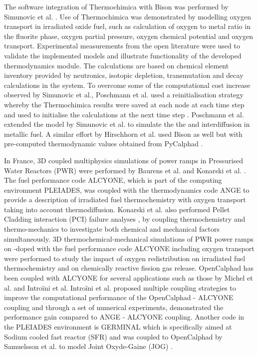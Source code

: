 	The software integration of Thermochimica with Bison was performed by Simunovic et al. \cite{Simunovic:2020aa}. Use of Thermochimica was demonstrated by modelling oxygen transport in irradiated  oxide fuel, such as calculation of oxygen to metal ratio in the fluorite phase, oxygen partial pressure, oxygen chemical potential and oxygen transport. Experimental measurements from the open literature were used to validate the implemented models and illustrate functionality of the developed thermodynamics module. The calculations are based on chemical element inventory provided by neutronics, isotopic depletion, transmutation and decay calculations in the \cite{SCALE05} system. To overcome some of the computational cost increase observed by Simunovic et al., Poschmann et al. used a reinitialisation strategy whereby the Thermochimica results were saved at each node at each time step and used to initialise the calculations at the next time step \cite{Poschmann:2019aa}. Poschmann et al. \cite{Poschmann:2021aa} extended the model by  Simunovic et al. to simulate the the  and  interdiffusion in  metallic fuel. A similar effort by Hirschhorn et al. used Bison as well but with pre-computed thermodynamic values obtained from PyCalphad \cite{Hirschhorn:2021aa}. 

	In France, 3D coupled multiphysics simulations of power ramps in Pressurised Water Reactors (PWR) were performed by Baurens et al. \cite{Baurens:2014aa} and  Konarski et al. \cite{KONARSKI2019104}. The fuel performance code {ALCYONE}, which is part of the computing environment {PLEIADES}, was coupled with the thermodynamics code {ANGE} to provide a description of irradiated fuel thermochemistry with oxygen transport taking into account thermodiffusion. Konarski et al. also performed Pellet Cladding interaction (PCI) failure analyses \cite{Piro:2020aa}, by coupling thermochemistry and thermo-mechanics to investigate both chemical and mechanical factors simultaneously. 3D thermochemical-mechanical simulations of PWR power ramps on -doped  with the fuel performance code {ALCYONE} including oxygen transport were performed to study the impact of oxygen redistribution on irradiated fuel thermochemistry and on chemically reactive fission gas release. OpenCalphad has been coupled with ALCYONE for several applications such as those by Michel et al. \cite{Michel:2013aa} and Intro\"{i}ni et al. Intro\"{i}ni et al. proposed multiple coupling strategies to improve the computational performance of the OpenCalphad - ALCYONE coupling and through a set of numerical experiments, demonstrated the performance gain compared to ANGE - ALCYONE coupling. Another code in the PLEIADES environment is GERMINAL which is specifically aimed at Sodium cooled fast reactor (SFR) and was coupled to OpenCalphad by Samuelsson et al. \cite{Samuelsson-Karl:2020aa} to model Joint Oxyde-Gaine (JOG) \cite{Gueneau:2020aa}.
	
